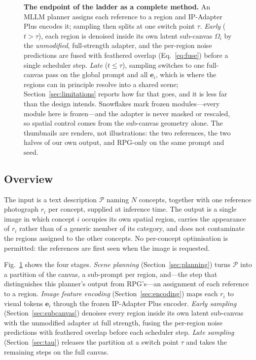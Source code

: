 \documentclass[10pt,twocolumn,letterpaper]{article}
\begin{document}
\begin{figure}[t]
  \centering
  \makebox[\linewidth][c]{}
  \caption{%
    \textbf{The endpoint of the ladder as a complete method.}
    An MLLM planner assigns each reference to a region and IP-Adapter Plus
    encodes it; sampling then splits at one switch point $\tau$.
    \emph{Early} ($t>\tau$), each region is denoised inside its own latent
    sub-canvas $\Omega_i$ by the \emph{unmodified}, full-strength adapter, and
    the per-region noise predictions are fused with feathered overlap
    (Eq.~\ref{eq:fuse}) before a single scheduler step.
    \emph{Late} ($t\le\tau$), sampling switches to one full-canvas pass on the
    global prompt and all $\mathbf{e}_i$, which is where the regions can in
    principle resolve into a shared scene; Section~\ref{sec:limitations}
    reports how far that goes, and it is less far than the design intends.
    Snowflakes mark frozen modules---every module here is frozen---and the
    adapter is never masked or rescaled, so spatial control comes from the
    sub-canvas geometry alone.  The thumbnails are renders, not illustrations:
    the two references, the two halves of our own output, and RPG-only on the
    same prompt and seed.
  }
  \label{fig:method}
\end{figure}

\subsection{Overview}
\label{sec:overview}

The input is a text description $\mathcal{P}$ naming $N$ concepts, together
with one reference photograph $r_i$ per concept, supplied at inference time.
The output is a single image in which concept $i$ occupies its own spatial
region, carries the appearance of $r_i$ rather than of a generic member of
its category, and does not contaminate the regions assigned to the other
concepts.  No per-concept optimisation is permitted: the references are first
seen when the image is requested.

Fig.~\ref{fig:method} shows the four stages.  \emph{Scene planning}
(Section~\ref{sec:planning}) turns $\mathcal{P}$ into a partition of the
canvas, a sub-prompt per region, and---the step that distinguishes this
planner's output from RPG's---an assignment of each reference to a region.
\emph{Image feature encoding} (Section~\ref{sec:encoding}) maps each $r_i$ to
visual tokens $\mathbf{e}_i$ through the frozen IP-Adapter Plus encoder.
\emph{Early sampling} (Section~\ref{sec:subcanvas}) denoises every region
inside its own latent sub-canvas with the unmodified adapter at full
strength, fusing the per-region noise predictions with feathered overlap
before each scheduler step.  \emph{Late sampling} (Section~\ref{sec:tau})
releases the partition at a switch point $\tau$ and takes the remaining steps
on the full canvas.
\end{document}
